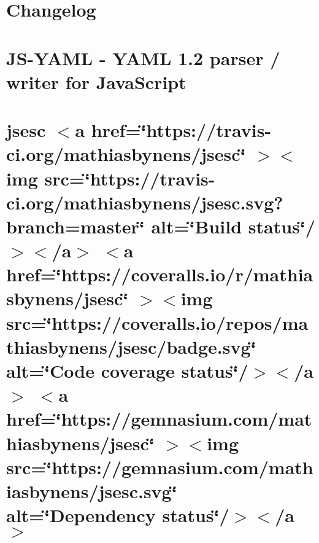 \documentclass[twoside]{book}
\newcommand{\+}{\discretionary{\mbox{\scriptsize$\hookleftarrow$}}{}{}}
\begin{document}
\chapter{Changelog}
\label{md__c___users_vaishnavi_jadhav__desktop__developer_code_mean_stack_example_client_node_modules_js_yaml__c_h_a_n_g_e_l_o_g}

\chapter{JS-\/\+YAML -\/ YAML 1.2 parser / writer for Java\+Script}
\label{md__c___users_vaishnavi_jadhav__desktop__developer_code_mean_stack_example_client_node_modules_js_yaml__r_e_a_d_m_e}

\chapter{jsesc \texorpdfstring{$<$}{<}a href=\char`\"{}https\+://travis-\/ci.\+org/mathiasbynens/jsesc\char`\"{} \texorpdfstring{$>$}{>}\texorpdfstring{$<$}{<}img src=\char`\"{}https\+://travis-\/ci.\+org/mathiasbynens/jsesc.\+svg?branch=master\char`\"{} alt=\char`\"{}\+Build status\char`\"{}/\texorpdfstring{$>$}{>}\texorpdfstring{$<$}{<}/a\texorpdfstring{$>$}{>} \texorpdfstring{$<$}{<}a href=\char`\"{}https\+://coveralls.\+io/r/mathiasbynens/jsesc\char`\"{} \texorpdfstring{$>$}{>}\texorpdfstring{$<$}{<}img src=\char`\"{}https\+://coveralls.\+io/repos/mathiasbynens/jsesc/badge.\+svg\char`\"{} alt=\char`\"{}\+Code coverage status\char`\"{}/\texorpdfstring{$>$}{>}\texorpdfstring{$<$}{<}/a\texorpdfstring{$>$}{>} \texorpdfstring{$<$}{<}a href=\char`\"{}https\+://gemnasium.\+com/mathiasbynens/jsesc\char`\"{} \texorpdfstring{$>$}{>}\texorpdfstring{$<$}{<}img src=\char`\"{}https\+://gemnasium.\+com/mathiasbynens/jsesc.\+svg\char`\"{} alt=\char`\"{}\+Dependency status\char`\"{}/\texorpdfstring{$>$}{>}\texorpdfstring{$<$}{<}/a\texorpdfstring{$>$}{>}}
\label{md__c___users_vaishnavi_jadhav__desktop__developer_code_mean_stack_example_client_node_modules_jsesc__r_e_a_d_m_e}

\end{document}
